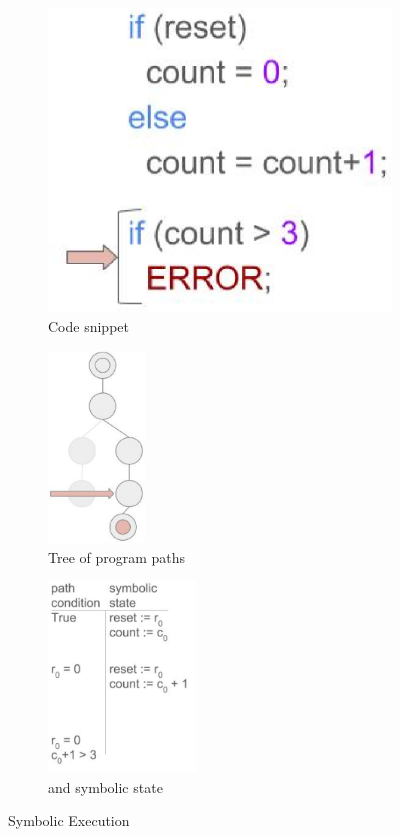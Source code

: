 \begin{figure}
  \centering
  \begin{subfigure}[b]{0.3\textwidth}
    \includegraphics[trim=0 -1cm 0 0,width=\textwidth]{secode}
    \caption{Code snippet}
    \label{fig:secode}
    \end{subfigure}
  \quad
  \begin{subfigure}[b]{0.3\textwidth}
    \includegraphics[trim=-2cm -.5cm 0 0,height=2in]{setree}
    \caption{Tree of program paths}
    \label{fig:setree}
    \end{subfigure}
  \quad
  \begin{subfigure}[b]{0.3\textwidth}
    \includegraphics[height=2in]{setable}
    \caption{\pathcondition{} and symbolic state}
    \label{fig:setable}
    \end{subfigure}
  \caption{Symbolic Execution}
  \label{fig:se}
  \end{figure}

